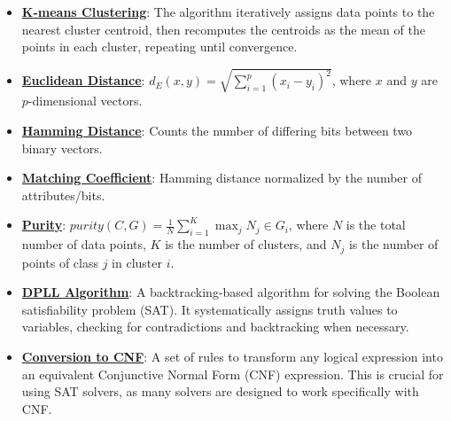\documentclass{article}%
\begin{document}
\begin{itemize}[leftmargin=*]%
\item \href{https://www.math.purdue.edu/~yipn/351/12L2-distance-clusters.pdf#page=22}{\textbf{K{-}means Clustering}}: The algorithm iteratively assigns data points to the nearest cluster centroid, then recomputes the centroids as the mean of the points in each cluster, repeating until convergence.%
\item \href{https://www.math.purdue.edu/~yipn/351/12L2-distance-clusters.pdf#page=17}{\textbf{Euclidean Distance}}: $d_E(x, y) = \sqrt{\sum_{i=1}^{p} (x_i - y_i)^2}$, where $x$ and $y$ are $p$-dimensional vectors.%
\item \href{https://www.math.purdue.edu/~yipn/351/12L2-distance-clusters.pdf#page=19}{\textbf{Hamming Distance}}: Counts the number of differing bits between two binary vectors.%
\item \href{https://www.math.purdue.edu/~yipn/351/12L2-distance-clusters.pdf#page=19}{\textbf{Matching Coefficient}}: Hamming distance normalized by the number of attributes/bits.%
\item \href{https://www.math.purdue.edu/~yipn/351/12L2-distance-clusters.pdf#page=44}{\textbf{Purity}}: $purity(C, G) = \frac{1}{N} \sum_{i=1}^{K} \max_{j} N_j \in G_i$, where $N$ is the total number of data points, $K$ is the number of clusters, and $N_j$ is the number of points of class $j$ in cluster $i$.%
\end{itemize}%
\begin{itemize}[leftmargin=*]%
\item \href{https://www.math.purdue.edu/~yipn/351/13L1-Logic.pdf#page=15}{\textbf{DPLL Algorithm}}: A backtracking-based algorithm for solving the Boolean satisfiability problem (SAT). It systematically assigns truth values to variables, checking for contradictions and backtracking when necessary.%
\item \href{https://www.math.purdue.edu/~yipn/351/13L1-Logic.pdf#page=17}{\textbf{Conversion to CNF}}: A set of rules to transform any logical expression into an equivalent Conjunctive Normal Form (CNF) expression. This is crucial for using SAT solvers, as many solvers are designed to work specifically with CNF.%
\end{itemize}%
\end{document}
